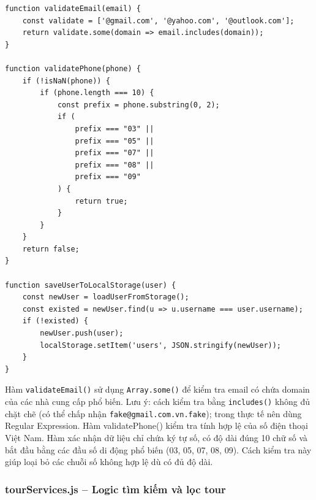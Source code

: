 \documentclass[12pt,a4paper]{article}
\begin{document}
\begin{lstlisting}[caption={authServices.js -- Kiểm tra định dạng email và số điện thoại}]
function validateEmail(email) {
    const validate = ['@gmail.com', '@yahoo.com', '@outlook.com'];
    return validate.some(domain => email.includes(domain));
}

function validatePhone(phone) {
    if (!isNaN(phone)) {
        if (phone.length === 10) {
            const prefix = phone.substring(0, 2);
            if (
                prefix === "03" ||
                prefix === "05" ||
                prefix === "07" ||
                prefix === "08" ||
                prefix === "09"
            ) {
                return true;
            }
        }
    }
    return false;
}

function saveUserToLocalStorage(user) {
    const newUser = loadUserFromStorage();
    const existed = newUser.find(u => u.username === user.username);
    if (!existed) {
        newUser.push(user);
        localStorage.setItem('users', JSON.stringify(newUser));
    }
}
\end{lstlisting}

Hàm \texttt{validateEmail()} sử dụng \texttt{Array.some()} để kiểm tra email có chứa domain của các nhà cung cấp phổ biến. Lưu ý: cách kiểm tra bằng \texttt{includes()} không đủ chặt chẽ (có thể chấp nhận \texttt{fake@gmail.com.vn.fake}); trong thực tế nên dùng Regular Expression. Hàm validatePhone() kiểm tra tính hợp lệ của số điện thoại Việt Nam. Hàm xác nhận dữ liệu chỉ chứa ký tự số, có độ dài đúng 10 chữ số và bắt đầu bằng các đầu số di động phổ biến (03, 05, 07, 08, 09). Cách kiểm tra này giúp loại bỏ các chuỗi số không hợp lệ dù có đủ độ dài.


\subsubsection{tourServices.js -- Logic tìm kiếm và lọc tour}
\end{document}
